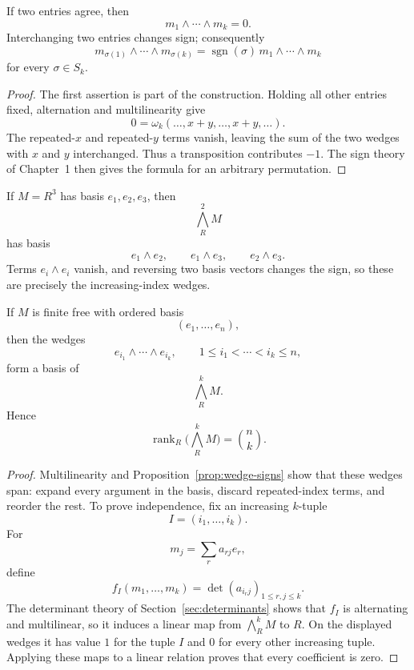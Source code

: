 \begin{proposition}\label{prop:wedge-signs}
If two entries agree, then
\[
m_1\wedge\cdots\wedge m_k=0.
\]
Interchanging two entries changes sign; consequently
\[
m_{\sigma(1)}\wedge\cdots\wedge m_{\sigma(k)}
=\operatorname{sgn}(\sigma)\,
m_1\wedge\cdots\wedge m_k
\]
for every \(\sigma\in S_k\).
\end{proposition}
\begin{proof}
The first assertion is part of the construction.  Holding all other entries
fixed, alternation and multilinearity give
\[
0=\omega_k(\ldots,x+y,\ldots,x+y,\ldots).
\]
The repeated-\(x\) and repeated-\(y\) terms vanish, leaving the sum of the
two wedges with \(x\) and \(y\) interchanged.  Thus a transposition
contributes \(-1\). The sign theory of Chapter~1 then gives the formula for
an arbitrary permutation.
\end{proof}

\begin{example}
If \(M=R^3\) has basis \(e_1,e_2,e_3\), then
\[
\bigwedge_R^2M
\]
has basis
\[
e_1\wedge e_2,\qquad e_1\wedge e_3,\qquad e_2\wedge e_3.
\]
Terms \(e_i\wedge e_i\) vanish, and reversing two basis vectors changes the
sign, so these are precisely the increasing-index wedges.
\end{example}

\begin{theorem}\label{thm:exterior-basis}
If \(M\) is finite free with ordered basis
\[
(e_1,\ldots,e_n),
\]
then the wedges
\[
e_{i_1}\wedge\cdots\wedge e_{i_k},
\qquad
1\leq i_1<\cdots<i_k\leq n,
\]
form a basis of
\[
\bigwedge_R^kM.
\]
Hence
\[
\operatorname{rank}_R\bigl(\bigwedge_R^kM\bigr)=\binom nk.
\]
\end{theorem}
\begin{proof}
Multilinearity and Proposition~\ref{prop:wedge-signs} show that these wedges
span: expand every argument in the basis, discard repeated-index terms, and
reorder the rest.  To prove independence, fix an increasing \(k\)-tuple
\[
I=(i_1,\ldots,i_k).
\]
For
\[
m_j=\sum_r a_{rj}e_r,
\]
define
\[
f_I(m_1,\ldots,m_k)=
\det(a_{i_rj})_{1\leq r,j\leq k}.
\]
The determinant theory of
Section~\ref{sec:determinants} shows that \(f_I\) is alternating
and multilinear, so it induces a linear map from \(\bigwedge_R^kM\) to
\(R\).  On the displayed wedges it has value \(1\) for the tuple \(I\) and
\(0\) for every other increasing tuple.  Applying these maps to a linear
relation proves that every coefficient is zero.
\end{proof}


